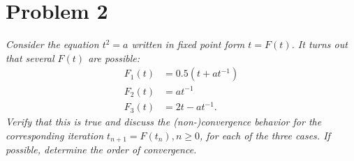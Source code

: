 \section{Problem 2}
\textit{Consider the equation $t^2 = a$ written in fixed point form $t = F(t)$. It turns out that several $F(t)$ are possible:}
\begin{align*}
    F_1(t) &= 0.5(t + at^{-1}) \\
    F_2(t) &= at^{-1} \\
    F_3(t) &= 2t - at^{-1}.
\end{align*}
\textit{Verify that this is true and discuss the (non-)convergence behavior for the corresponding iteration $t_{n+1} = F(t_n), n \ge 0$, for each of the three cases. If possible, determine the order of convergence.}